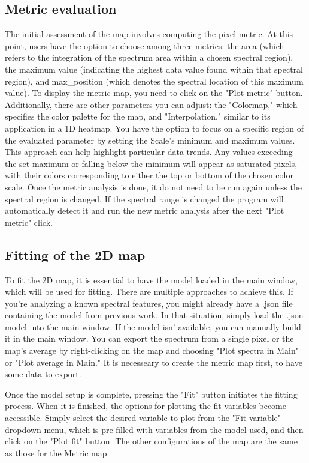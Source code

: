 \subsection{Metric evaluation}
The initial assessment of the map involves computing the pixel metric. At this point, users have the option to choose among three metrics: the area (which refers to the integration of the spectrum area within a chosen spectral region), the maximum value (indicating the highest data value found within that spectral region), and max\_position (which denotes the spectral location of this maximum value). To display the metric map, you need to click on the "Plot metric" button. Additionally, there are other parameters you can adjust: the "Colormap," which specifies the color palette for the map, and "Interpolation," similar to its application in a 1D heatmap. You have the option to focus on a specific region of the evaluated parameter by setting the Scale's minimum and maximum values. This approach can help highlight particular data trends. Any values exceeding the set maximum or falling below the minimum will appear as saturated pixels, with their colors corresponding to either the top or bottom of the chosen color scale. Once the metric analysis is done, it do not need to be run again unless the spectral region is changed. If the spectral range is changed the program will automatically detect it and run the new metric analysis after the next "Plot metric" click.

\subsection{Fitting of the 2D map}
To fit the 2D map, it is essential to have the model loaded in the main window, which will be used for fitting. There are multiple approaches to achieve this. If you're analyzing a known spectral features, you might already have a .json file containing the model from previous work. In that situation, simply load the .json model into the main window. If the model isn' available, you can manually build it in the main window. You can export the spectrum from a single pixel or the map's average by right-clicking on the map and choosing "Plot spectra in Main" or "Plot average in Main." It is necesseary to create the metric map first, to have some data to export.

Once the model setup is complete, pressing the "Fit" button initiates the fitting process. When it is finished, the options for plotting the fit variables become accessible. Simply select the desired variable to plot from the "Fit variable" dropdown menu, which is pre-filled with variables from the model used, and then click on the "Plot fit" button. The other configurations of the map are the same as those for the Metric map.

